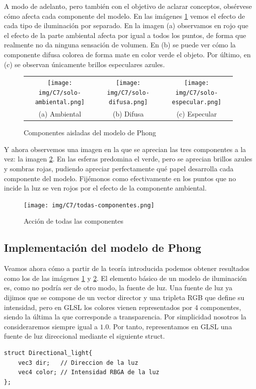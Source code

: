 A modo de adelanto, pero también con el objetivo de aclarar conceptos, obsérvese cómo afecta cada componente del modelo. En las imágenes \ref{fig:componentes-aisladas} vemos el efecto de cada tipo de iluminación por separado. En la imagen (a) observamos en rojo que el efecto de la parte ambiental afecta por igual a todos los puntos, de forma que realmente no da ninguna sensación de volumen. En (b) se puede ver cómo la componente difusa colorea de forma mate en color verde el objeto. Por último, en (c) se observan únicamente brillos especulares azules.

\begin{figure}[ht]
    \centering
    \begin{tabular}{ccc}
      \texttt{[image: img/C7/solo-ambiental.png]} &   \texttt{[image: img/C7/solo-difusa.png]} &   \texttt{[image: img/C7/solo-especular.png]} \\
    (a) Ambiental & (b) Difusa & (c) Especular \\[6pt]
    \end{tabular}
    \caption{Componentes aisladas del modelo de Phong}
    \label{fig:componentes-aisladas}
\end{figure}

Y ahora observemos una imagen en la que se aprecian las tres componentes a la vez: la imagen \ref{fig:todas-componentes}. En las esferas predomina el verde, pero se aprecian brillos azules y sombras rojas, pudiendo apreciar perfectamente qué papel desarrolla cada componente del modelo. Fijémonos como efectivamente en los puntos que no incide la luz se ven rojos por el efecto de la componente ambiental.

\begin{figure} [ht]
    \centering
    \texttt{[image: img/C7/todas-componentes.png]}
    \caption{Acción de todas las componentes}
    \label{fig:todas-componentes}
\end{figure}

\subsection{Implementación del modelo de Phong}

Veamos ahora cómo a partir de la teoría introducida podemos obtener resultados como los de las imágenes \ref{fig:componentes-aisladas} y \ref{fig:todas-componentes}. El elemento básico de un modelo de iluminación es, como no podría ser de otro modo, la fuente de luz. Una fuente de luz ya dijimos que se compone de un vector director y una tripleta RGB que define su intensidad, pero en GLSL los colores vienen representados por 4 componentes, siendo la última la que corresponde a transparencia. Por simplicidad nosotros la consideraremos siempre igual a $1.0$. Por tanto, representamos en GLSL una fuente de luz direccional mediante el siguiente struct.
\begin{lstlisting}
struct Directional_light{
    vec3 dir;   // Direccion de la luz
    vec4 color; // Intensidad RBGA de la luz
};    
\end{lstlisting}

